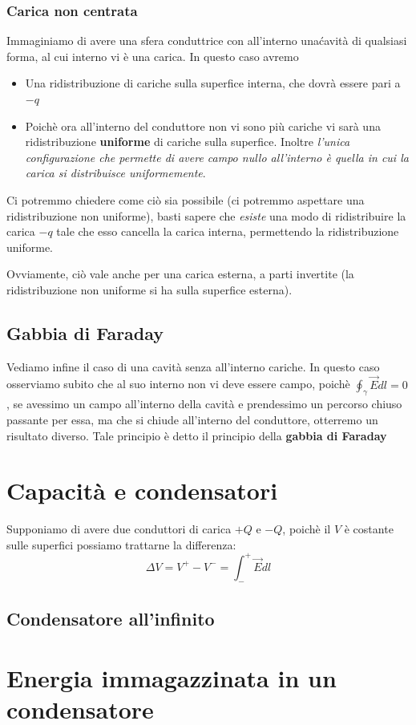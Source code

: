 \documentclass{book}
\begin{document}
\subsubsection{Carica non centrata}
Immaginiamo di avere una sfera conduttrice con all'interno una\' cavità di qualsiasi forma, al cui interno vi è una carica. In questo caso avremo
\begin{itemize}
  \item Una ridistribuzione di cariche sulla superfice interna, che dovrà essere pari a $-q$
  \item Poichè ora all'interno del conduttore non vi sono più cariche vi sarà una ridistribuzione \textbf{uniforme} di cariche sulla superfice. Inoltre
  \textit{l'unica configurazione che permette di avere campo nullo all'interno è quella in cui la carica si distribuisce uniformemente}.
\end{itemize}
Ci potremmo chiedere come ciò sia possibile (ci potremmo aspettare una ridistribuzione non uniforme), basti sapere che \textit{esiste} una modo di ridistribuire la carica $-q$
tale che esso cancella la carica interna, permettendo la ridistribuzione uniforme.

Ovviamente, ciò vale anche per una carica esterna, a parti invertite (la ridistribuzione non uniforme si ha sulla superfice esterna).
\subsection{Gabbia di Faraday}
Vediamo infine il caso di una cavità senza all'interno cariche. In questo caso osserviamo subito che al suo interno non vi deve essere campo, poichè $\oint_\gamma \vec{E} dl=0$,
se avessimo un campo all'interno della cavità e prendessimo un percorso chiuso passante per essa, ma che si chiude all'interno del conduttore, otterremo un risultato diverso.
Tale principio è detto il principio della \textbf{gabbia di Faraday}
\section{Capacit\`a e condensatori}
Supponiamo di avere due conduttori di carica $+Q$ e $-Q$, poichè il $V$ è costante sulle superfici possiamo trattarne la differenza:
\[
\Delta V = V^+ -V^- = \int_{-}^{+} \vec{E} dl
\]
\subsection{Condensatore all'infinito}
\section{Energia immagazzinata in un condensatore}
\end{document}
